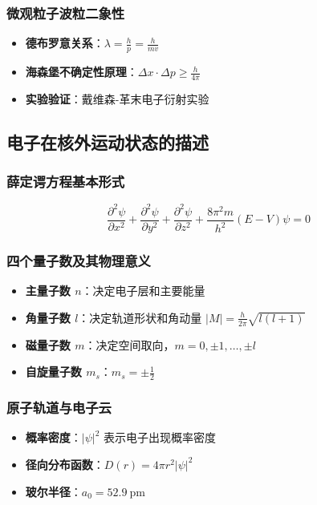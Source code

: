 \documentclass{article}
\begin{document}
\subsubsection{微观粒子波粒二象性}
\begin{itemize}
    \item \textbf{德布罗意关系}：$\lambda = \frac{h}{p} = \frac{h}{mv}$
    \item \textbf{海森堡不确定性原理}：$\Delta x \cdot \Delta p \geq \frac{h}{4\pi}$
    \item \textbf{实验验证}：戴维森-革末电子衍射实验
\end{itemize}

\subsection{电子在核外运动状态的描述}

\subsubsection{薛定谔方程基本形式}
\[
\frac{\partial^2 \psi}{\partial x^2} + \frac{\partial^2 \psi}{\partial y^2} + \frac{\partial^2 \psi}{\partial z^2} + \frac{8\pi^2 m}{h^2}(E - V)\psi = 0
\]

\subsubsection{四个量子数及其物理意义}
\begin{itemize}
    \item \textbf{主量子数 $n$}：决定电子层和主要能量
    \item \textbf{角量子数 $l$}：决定轨道形状和角动量
        $|M| = \frac{h}{2\pi}\sqrt{l(l+1)}$
    \item \textbf{磁量子数 $m$}：决定空间取向，$m = 0,\pm1,\dots,\pm l$
    \item \textbf{自旋量子数 $m_s$}：$m_s = \pm\frac{1}{2}$
\end{itemize}

\subsubsection{原子轨道与电子云}
\begin{itemize}
    \item \textbf{概率密度}：$|\psi|^2$ 表示电子出现概率密度
    \item \textbf{径向分布函数}：$D(r) = 4\pi r^2 |\psi|^2$
    \item \textbf{玻尔半径}：$a_0 = \SI{52.9}{\pico\meter}$
\end{itemize}
\end{document}
